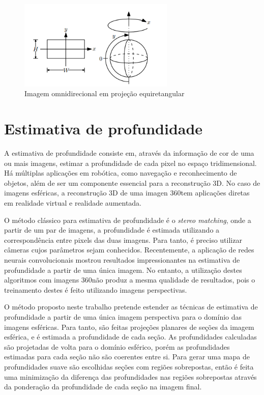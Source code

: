 \documentclass[cic,tc]{iiufrgs}
\begin{document}
\begin{figure}
    \caption{Imagem omnidirecional em projeção equiretangular}
    \begin{center}
        \includegraphics[width=20em]{equiretangular.png}
    \end{center}
    \label{fig:sphericalIm}
\end{figure}

\section{Estimativa de profundidade}

A estimativa de profundidade consiste em, através da informação de cor de uma ou mais imagens, estimar a profundidade de cada pixel no espaço tridimensional. Há múltiplas aplicações em robótica, como navegação e reconhecimento de objetos, além de ser um componente essencial para a reconstrução 3D. No caso de imagens esféricas, a reconstrução 3D de uma imagen 360\degree tem aplicações diretas em realidade virtual e realidade aumentada.

O método clássico para estimativa de profundidade é o \textit{stereo matching}, onde a partir de um par de imagens, a profundidade é estimada utilizando a correspondência entre pixels das duas imagens. Para tanto, é preciso utilizar câmeras cujos parâmetros sejam conhecidos. Recentemente, a aplicação de redes neurais convolucionais mostrou resultados impressionantes na estimativa de profundidade a partir de uma única imagem. No entanto, a utilização destes algoritmos com imagens 360\degree não produz a mesma qualidade de resultados, pois o treinamento destes é feito utilizando imagens perspectivas.

O método proposto neste trabalho pretende estender as técnicas de estimativa de profundidade a partir de uma única imagem perspectiva para o domínio das imagens esféricas. Para tanto, são feitas projeções planares de seções da imagem esférica, e é estimada a profundidade de cada seção. As profundidades calculadas são projetadas de volta para o domínio esférico, porém as profundidades estimadas para cada seção não são coerentes entre si. Para gerar uma mapa de profundidades suave são escolhidas seções com regiões sobrepostas, então é feita uma minimização da diferença das profundidades nas regiões sobrepostas através da ponderação da profundidade de cada seção na imagem final.
\end{document}

